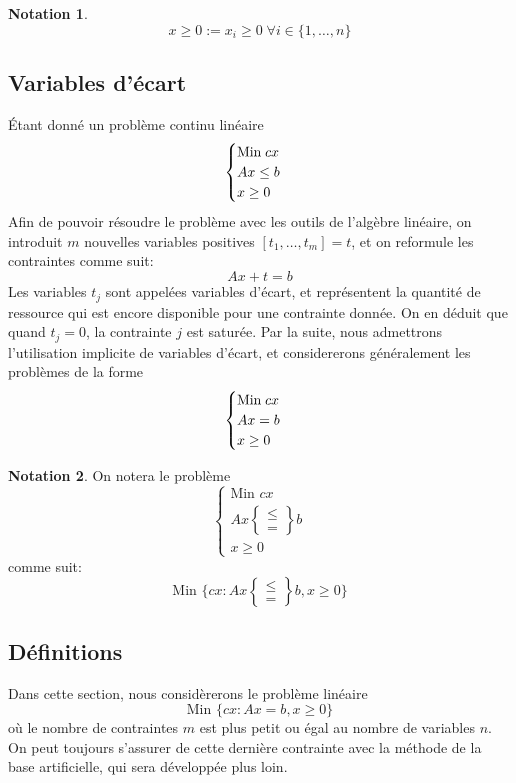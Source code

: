 \documentclass[a4paper]{report}
\theoremstyle{definition}
\newtheorem*{notation}{Notation}
\theoremstyle{remark}
\theoremstyle{plain}
\begin{document}
\begin{notation}
	\[x\ge 0 := x_i\ge 0\;\forall i\in\{1,\dots,n\}\]
\end{notation}

\subsection{Variables d'écart}
Étant donné un problème continu linéaire
\[\begin{cases}
\text{Min\;} cx \\
Ax \le b \\
x \ge 0
\end{cases}\]
Afin de pouvoir résoudre le problème avec les outils de l'algèbre linéaire, on
introduit \(m\) nouvelles variables positives
\([t_1,\dots,t_m]=t\), et on reformule les contraintes comme suit:
\[Ax+t=b\]
Les variables \(t_j\) sont appelées variables d'écart, et représentent la
quantité de ressource qui est encore disponible pour une contrainte donnée.
On en déduit que quand \(t_j=0\), la contrainte \(j\) est saturée.
Par la suite, nous admettrons l'utilisation implicite de variables d'écart,
et considererons généralement les problèmes de la forme
\[\begin{cases}
\text{Min\;} cx \\
Ax = b \\
x \ge 0
\end{cases}\]

\begin{notation}
On notera le problème
\[\begin{cases}
\text{Min } cx \\
Ax \begin{Bmatrix}\le\\=\end{Bmatrix}b \\
x \ge 0
\end{cases}\]
comme suit:
\[\text{Min }\{cx:Ax\begin{Bmatrix}\le\\=\end{Bmatrix}b,x\ge0\}\]
\end{notation}

\subsection{Définitions}
Dans cette section, nous considèrerons le problème linéaire
\[\text{Min }\{cx:Ax=b,x\ge0\}\]
où le nombre de contraintes \(m\) est plus petit ou égal au nombre de variables
\(n\). On peut toujours s'assurer de cette dernière contrainte avec la méthode
de la base artificielle, qui sera développée plus loin.
\end{document}
